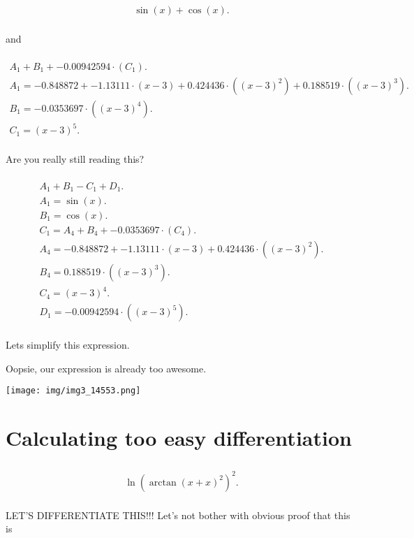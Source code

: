 \documentclass[12pt,a4paper]{extreport}
\begin{document}
\begin{multline}
\\
\sin(x) + \cos(x).\\
\end{multline}


and


\begin{multline}
\\
A_{1} + B_{1} + -0.00942594 \cdot (C_{1}).\\
A_{1} = -0.848872 + -1.13111 \cdot (x - 3) + 0.424436 \cdot ((x - 3) ^ {2}) + 0.188519 \cdot ((x - 3) ^ {3}).\\
B_{1} = -0.0353697 \cdot ((x - 3) ^ {4}).\\
C_{1} = (x - 3) ^ {5}.\\
\end{multline}

Are you really still reading this? 

\begin{multline}
\\
A_{1} + B_{1} - C_{1} + D_{1}.\\
A_{1} = \sin(x).\\
B_{1} = \cos(x).\\
C_{1} = A_{4} + B_{4} + -0.0353697 \cdot (C_{4}).\\
A_{4} = -0.848872 + -1.13111 \cdot (x - 3) + 0.424436 \cdot ((x - 3) ^ {2}).\\
B_{4} = 0.188519 \cdot ((x - 3) ^ {3}).\\
C_{4} = (x - 3) ^ {4}.\\
D_{1} = -0.00942594 \cdot ((x - 3) ^ {5}).\\
\end{multline}


Lets simplify this expression.

Oopsie, our expression is already too awesome.

\texttt{[image: img/img3\_14553.png]}
\section{Calculating too easy differentiation}


\begin{multline}
\\
\ln(\arctan(x + x) ^ {2}) ^ {2}.\\
\end{multline}


LET'S DIFFERENTIATE THIS!!!
Let's not bother with obvious proof that this is 
\end{document}
